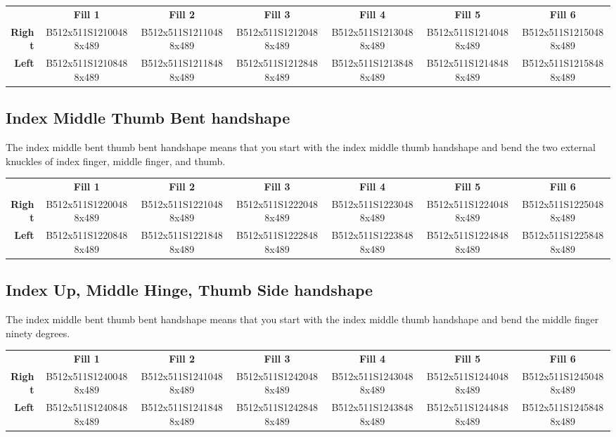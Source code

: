 \documentclass{article}
\begin{document}
\begin{center}
\begin{tabular}{r*{6}{c}}
&\textbf{Fill 1}&\textbf{Fill 2}&\textbf{Fill 3}&\textbf{Fill 4}&\textbf{Fill 5}&\textbf{Fill 6}\\
\textbf{Right}&
B512x511S12100488x489&
B512x511S12110488x489&
B512x511S12120488x489&
B512x511S12130488x489&
B512x511S12140488x489&
B512x511S12150488x489\\
\textbf{Left}&
B512x511S12108488x489&
B512x511S12118488x489&
B512x511S12128488x489&
B512x511S12138488x489&
B512x511S12148488x489&
B512x511S12158488x489\\
\end{tabular}
\end{center}

\subsection{Index Middle Thumb Bent handshape}

The index middle bent thumb bent handshape means that you start with the index middle thumb handshape and bend the two external knuckles of index finger, middle finger, and thumb.

\begin{center}
\begin{tabular}{r*{6}{c}}
&\textbf{Fill 1}&\textbf{Fill 2}&\textbf{Fill 3}&\textbf{Fill 4}&\textbf{Fill 5}&\textbf{Fill 6}\\
\textbf{Right}&
B512x511S12200488x489&
B512x511S12210488x489&
B512x511S12220488x489&
B512x511S12230488x489&
B512x511S12240488x489&
B512x511S12250488x489\\
\textbf{Left}&
B512x511S12208488x489&
B512x511S12218488x489&
B512x511S12228488x489&
B512x511S12238488x489&
B512x511S12248488x489&
B512x511S12258488x489\\
\end{tabular}
\end{center}

\subsection{Index Up, Middle Hinge, Thumb Side handshape}

The index middle bent thumb bent handshape means that you start with the index middle thumb handshape and bend the middle finger ninety degrees.

\begin{center}
\begin{tabular}{r*{6}{c}}
&\textbf{Fill 1}&\textbf{Fill 2}&\textbf{Fill 3}&\textbf{Fill 4}&\textbf{Fill 5}&\textbf{Fill 6}\\
\textbf{Right}&
B512x511S12400488x489&
B512x511S12410488x489&
B512x511S12420488x489&
B512x511S12430488x489&
B512x511S12440488x489&
B512x511S12450488x489\\
\textbf{Left}&
B512x511S12408488x489&
B512x511S12418488x489&
B512x511S12428488x489&
B512x511S12438488x489&
B512x511S12448488x489&
B512x511S12458488x489\\
\end{tabular}
\end{center}
\end{document}
